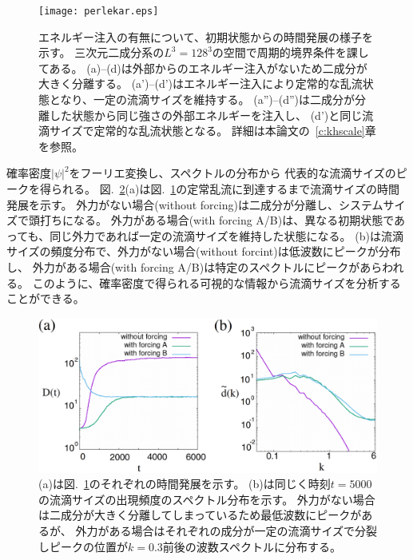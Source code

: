 \documentclass[12pt,a4paper]{jbook}
\begin{document}
		\begin{figure}[H]
			\begin{center}
			\texttt{[image: perlekar.eps]}
			\caption{
                エネルギー注入の有無について、初期状態からの時間発展の様子を示す。
                三次元二成分系の$L^3=128^3$の空間で周期的境界条件を課してある。
				(a)--(d)は外部からのエネルギー注入がないため二成分が大きく分離する。
				(a')--(d')はエネルギー注入により定常的な乱流状態となり、一定の流滴サイズを維持する。
				(a'')--(d'')は二成分が分離した状態から同じ強さの外部エネルギーを注入し、
                (d')と同じ流滴サイズで定常的な乱流状態となる。
                詳細は本論文の~\ref{c:khscale}章を参照。
			}
			\label{FIG:perlekar}
			\end{center}
		\end{figure}
        確率密度$|\psi|^2$をフーリエ変換し、スペクトルの分布から
        代表的な流滴サイズのピークを得られる。
        図.~\ref{FIG:perlekar2}(a)は図.~\ref{FIG:perlekar}の定常乱流に到達するまで流滴サイズの時間発展を示す。
        外力がない場合(without forcing)は二成分が分離し、システムサイズで頭打ちになる。
        外力がある場合(with forcing A/B)は、異なる初期状態であっても、同じ外力であれば一定の流滴サイズを維持した状態になる。
        (b)は流滴サイズの頻度分布で、外力がない場合(without forcint)は低波数にピークが分布し、
        外力がある場合(with forcing A/B)は特定のスペクトルにピークがあらわれる。
        このように、確率密度で得られる可視的な情報から流滴サイズを分析することができる。
		\begin{figure}[H]
			\begin{center}
			\includegraphics[width=16cm]{perlekar2.eps}
			\caption{
				(a)は図.~\ref{FIG:perlekar}のそれぞれの時間発展を示す。
				(b)は同じく時刻$t=5000$の流滴サイズの出現頻度のスペクトル分布を示す。
                外力がない場合は二成分が大きく分離してしまっているため最低波数にピークがあるが、
                外力がある場合はそれぞれの成分が一定の流滴サイズで分裂しピークの位置が$k=0.3$前後の波数スペクトルに分布する。
			}
			\label{FIG:perlekar2}
			\end{center}
		\end{figure}
\end{document}
